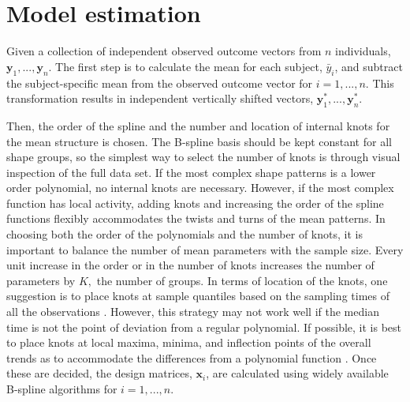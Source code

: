 \documentclass[12pt]{article}
\newcommand{\B}[0]{\mathbf}
\begin{document}
\section{Model estimation}
Given a collection of independent observed outcome vectors from $n$ individuals, $\B y_{1},...,\B y_{n}$. The first step is to calculate the mean for each subject, $\bar{y}_{i}$,  and subtract the subject-specific mean from the observed outcome vector for $i=1,...,n$. This transformation results in independent vertically shifted vectors, $\B y^{*}_{1},...,\B y^{*}_{n}$.  

Then, the order of the spline and the number and location of internal knots for the mean structure is chosen. The B-spline basis should be kept constant for all shape groups, so the simplest way to select the number of knots is through visual inspection of the full data set. If the most complex shape patterns is a lower order polynomial, no internal knots are necessary. However, if the most complex function has local activity, adding knots and increasing the order of the spline functions flexibly accommodates the twists and turns of the mean patterns. In choosing both the order of the polynomials and the number of knots, it is important to balance the number of mean parameters with the sample size. Every unit increase in the order or in the number of knots increases the number of parameters by $K,$ the number of groups. In terms of location of the knots, one suggestion is to place knots at sample quantiles based on the sampling times of all the observations \cite{ruppert2002}. However, this strategy may not work well if the median time is not the point of deviation from a regular polynomial. If possible, it is best to place knots at local maxima, minima, and inflection points of the overall trends as to accommodate the differences from a polynomial function \cite{eubank1999}.  Once these are decided, the design matrices, $\B x_{i}$, are calculated using widely available B-spline algorithms for $i=1,...,n$. 
\end{document}
